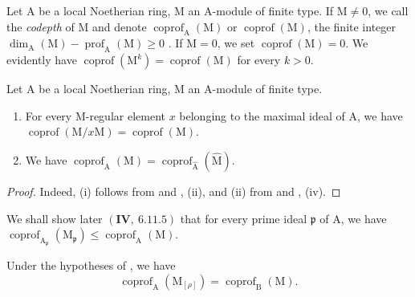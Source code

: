 \begin{definition}[16.4.9]
\label{0.16.4.9}
Let $\mathrm{A}$ be a local Noetherian ring, $\mathrm{M}$ an $\mathrm{A}$-module of finite type.
If $\mathrm{M}\neq 0$, we call the \emph{codepth} of $\mathrm{M}$ and denote $\operatorname{coprof}_\mathrm{A}(\mathrm{M})$ or $\operatorname{coprof}(\mathrm{M})$, the finite integer $\dim_\mathrm{A}(\mathrm{M})-\operatorname{prof}_\mathrm{A}(\mathrm{M})\geq 0$ .
If $\mathrm{M}=0$, we set $\operatorname{coprof}(\mathrm{M})=0$.
We evidently have $\operatorname{coprof}(\mathrm{M}^k)=\operatorname{coprof}(\mathrm{M})$ for every $k>0$.
\end{definition}

\begin{proposition}[16.4.10]
\label{0.16.4.10}
Let $\mathrm{A}$ be a local Noetherian ring, $\mathrm{M}$ an $\mathrm{A}$-module of finite type.
\begin{enumerate}
  \item[\rm{(i)}] For every $\mathrm{M}$-regular element $x$ belonging to the maximal ideal of $\mathrm{A}$, we have $\operatorname{coprof}(\mathrm{M}/x\mathrm{M})=\operatorname{coprof}(\mathrm{M})$.
  \item[\rm{(ii)}] We have $\operatorname{coprof}_\mathrm{A}(\mathrm{M})=\operatorname{coprof}_{\widehat{\mathrm{A}}}(\widehat{\mathrm{M}})$.
\end{enumerate}
\end{proposition}

\begin{proof}
Indeed, (i) follows from  and , (ii), and (ii) from  and , (iv).
\end{proof}

We shall show later $(\mathbf{IV},~6.11.5)$ that for every prime ideal $\mathfrak{p}$ of $\mathrm{A}$, we have $\operatorname{coprof}_{\mathrm{A}_\mathfrak{p}}(\mathrm{M}_\mathfrak{p})\leq\operatorname{coprof}_\mathrm{A}(\mathrm{M})$.

\begin{proposition}[16.4.11]
\label{0.16.4.11}
Under the hypotheses of , we have
\begin{equation}
\label{0.16.4.11.1}
\tag{16.4.11.1}
  \operatorname{coprof}_\mathrm{A}(\mathrm{M}_{[\rho]})=\operatorname{coprof}_\mathrm{B}(\mathrm{M}).
\end{equation}
\end{proposition}

